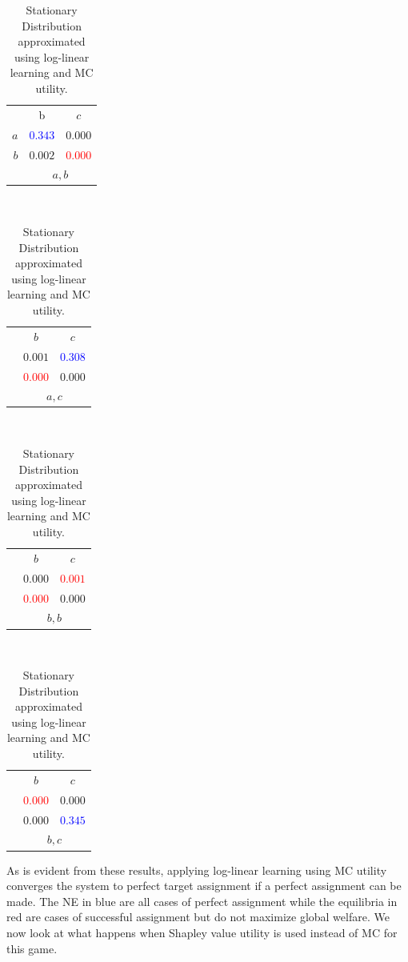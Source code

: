 \documentclass[11pt, onecolumn, compsoc, letterpaper]{article}
\begin{document}
\begin{table}[!htb]
	\centering\begin{tabular}{r|c|c|}
	\multicolumn{1}{c}{}
	& \multicolumn{1}{c}{b}
	& \multicolumn{1}{c}{$c$}\\
	\cline{2-3}
	$a$ & \textcolor{blue}{$0.343$} & $0.000$\\
	\cline{2-3}
	$b$ & $0.002$ & \textcolor{red}{$0.000$}\\
	\cline{2-3}
	\multicolumn{1}{c}{}
	& \multicolumn{2}{c}{$a,b$}
	\end{tabular}~
	\centering\begin{tabular}{r|c|c|}
	\multicolumn{1}{c}{}
	& \multicolumn{1}{c}{$b$}
	& \multicolumn{1}{c}{$c$}\\
	\cline{2-3}
	& $0.001$ & \textcolor{blue}{$0.308$}\\
	\cline{2-3}
	& \textcolor{red}{$0.000$} & $0.000$\\
	\cline{2-3}
	\multicolumn{1}{c}{}
	& \multicolumn{2}{c}{$a,c$}
	\end{tabular}~
	\centering\begin{tabular}{r|c|c|}
	\multicolumn{1}{c}{}
	& \multicolumn{1}{c}{$b$}
	& \multicolumn{1}{c}{$c$}\\
	\cline{2-3}
	& $0.000$ & \textcolor{red}{$0.001$}\\
	\cline{2-3}
	& \textcolor{red}{$0.000$} & $0.000$\\
	\cline{2-3}
	\multicolumn{1}{c}{}
	& \multicolumn{2}{c}{$b,b$}
	\end{tabular}~
	\centering\begin{tabular}{r|c|c|}
	\multicolumn{1}{c}{}
	& \multicolumn{1}{c}{$b$}
	& \multicolumn{1}{c}{$c$}\\
	\cline{2-3}
	& \textcolor{red}{$0.000$} & $0.000$\\
	\cline{2-3}
	& $0.000$ & \textcolor{blue}{$0.345$}\\
	\cline{2-3}
	\multicolumn{1}{c}{}
	& \multicolumn{2}{c}{$b,c$}
	\end{tabular}
	\centering\caption{Stationary Distribution approximated using log-linear learning and MC utility.}\label{tab:mcsd}
\end{table}

As is evident from these results, applying log-linear learning using MC utility converges the system to perfect target assignment if a perfect assignment can be made. The NE in blue are all cases of perfect assignment while the equilibria in red are cases of successful assignment but do not maximize global welfare. We now look at what happens when Shapley value utility is used instead of MC for this game.
\end{document}
